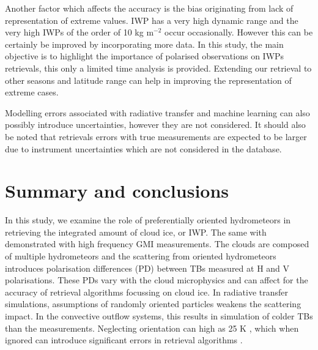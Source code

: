 \documentclass[amt, manuscript]{copernicus}
\begin{document}
Another factor which affects the accuracy is the bias originating from lack of representation of extreme values. IWP has a very high dynamic range and the very high IWPs of the order of 10\,\,kg m$^{-2}$ occur occasionally. However this can be certainly be improved by incorporating more data. In this study, the main objective is to highlight the importance of polarised observations on IWPs retrievals, this only a limited time analysis is provided. Extending our retrieval to other seasons and latitude range can help in improving the representation of extreme cases. 

Modelling errors associated with radiative transfer and machine learning can also possibly introduce uncertainties, however they are not considered. It should also be noted that retrievals errors with true measurements are expected to be larger due to instrument uncertainties which are not considered in the database. 


\section{Summary and conclusions}
%
\label{sec:conclusions}

In this study, we examine the role of preferentially oriented hydrometeors in retrieving the integrated amount of cloud ice, or IWP. The same with demonstrated with high frequency GMI measurements. The clouds are composed of multiple hydrometeors and the scattering from oriented hydrometeors introduces polarisation differences (PD) between TBs measured at H and V polarisations. These PDs vary with the cloud microphysics and can affect for the accuracy of retrieval algorithms focussing on cloud ice. In radiative transfer simulations, assumptions of randomly oriented particles weakens the scattering impact. In the convective outflow systems, this results in simulation of colder TBs than the measurements. Neglecting orientation can  high as 25\,\,K , which when ignored can introduce significant errors in retrieval algorithms .
\end{document}
